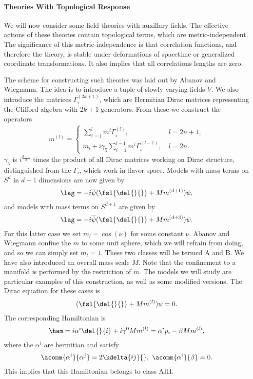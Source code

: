 \paragraph{Theories With Topological Response}
We will now consider some field theories with auxillary fields. The effective actions of these theories contain topological terms, which are metric-independent. The significance of this metric-independence is that correlation functions, and therefore the theory, is stable under deformations of spacetime or generalized coordinate transformations. It also implies that all correlations lengths are zero.

The scheme for constructing such theories was laid out by Abanov and Wiegmann. The idea is to introduce a tuple of slowly varying fields $V$. We also introduce the matrices $\Gamma_{i}^{(2k + 1)}$, which are Hermitian Dirac matrices representing the Clifford algebra with $2k + 1$ generators. From these we construct the operators
\begin{align*}
	m^{(l)} = \begin{cases}
		\sum\limits_{i = 1}^{l}m^{i}\Gamma^{(l)}_{i},\ &l = 2n + 1, \\
		m_{l} + i\gamma_{5}\sum\limits_{i = 1}^{l - 1}m^{i}\Gamma^{(l - 1)}_{i},\ &l = 2n.
	\end{cases}
\end{align*}
$\gamma_{5}$ is $i^{\frac{d - 1}{2}}$ times the product of all Dirac matrices working on Dirac structure, distinguished from the $\Gamma_{i}$, which work in flavor space. Models with mass terms on $S^{d}$ in $d + 1$ dimensions are now given by
\begin{align*}
	\lag = -i\overline{\psi}(\fsl{\del{}{}} + Mm^{(d + 1)})\psi,
\end{align*}
and models with mass terms on $S^{d + 1}$ are given by
\begin{align*}
	\lag = -i\overline{\psi}(\fsl{\del{}{}} + Mm^{(d + 3)})\psi.
\end{align*}
For this latter case we set $m_{l} = \cos(\nu)$ for some constant $\nu$. Abanov and Wiegmann confine the $m$ to some unit sphere, which we will refrain from doing, and so we can simply set $m_{l} = 1$. These two classes will be termed A and B. We have also introduced an overall mass scale $M$. Note that the confinement to a manifold is performed by the restriction of $m$. The models we will study are particular examples of this construction, as well as some modified versions. The Dirac equation for these cases is
\begin{align*}
	(\fsl{\del{}{}} + Mm^{(l)})\psi = 0.
\end{align*}
The corresponding Hamiltonian is
\begin{align*}
	\ham = i\alpha^{i}\del{}{i} + i\gamma^{0}Mm^{(l)} = \alpha^{i}p_{i} - \beta Mm^{(l)},
\end{align*}
where the $\alpha^{i}$ are hermitian and satisfy
\begin{align*}
	\acomm{\alpha^{i}}{\alpha^{j}} = 2\kdelta{ij}{},\ \acomm{\alpha^{i}}{\beta} = 0.
\end{align*}
This implies that this Hamiltonian belongs to class AIII.

